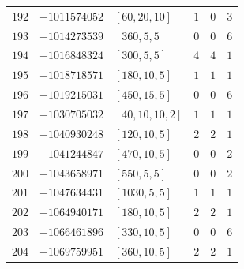 \documentclass[11pt]{article}
\begin{document}
\begin{center}
\begin{longtable}{r r l c c c}
$192$ & $-1011574052$ & $[60,20,10]$ & $1$ & $0$ & $3$\\
$193$ & $-1014273539$ & $[360,5,5]$ & $0$ & $0$ & $6$\\
$194$ & $-1016848324$ & $[300,5,5]$ & $4$ & $4$ & $1$\\
$195$ & $-1018718571$ & $[180,10,5]$ & $1$ & $1$ & $1$\\
$196$ & $-1019215031$ & $[450,15,5]$ & $0$ & $0$ & $6$\\
$197$ & $-1030705032$ & $[40,10,10,2]$ & $1$ & $1$ & $1$\\
$198$ & $-1040930248$ & $[120,10,5]$ & $2$ & $2$ & $1$\\
$199$ & $-1041244847$ & $[470,10,5]$ & $0$ & $0$ & $2$\\
$200$ & $-1043658971$ & $[550,5,5]$ & $0$ & $0$ & $2$\\
$201$ & $-1047634431$ & $[1030,5,5]$ & $1$ & $1$ & $1$\\
$202$ & $-1064940171$ & $[180,10,5]$ & $2$ & $2$ & $1$\\
$203$ & $-1066461896$ & $[330,10,5]$ & $0$ & $0$ & $6$\\
$204$ & $-1069759951$ & $[360,10,5]$ & $2$ & $2$ & $1$\\
\end{longtable}
\end{center}
\end{document}
